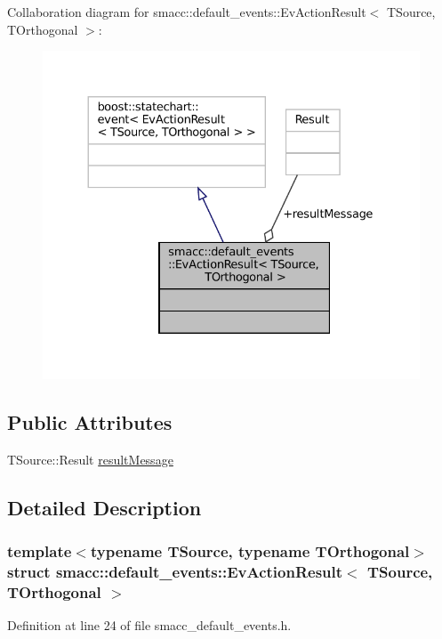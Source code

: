 Collaboration diagram for smacc\+:\+:default\+\_\+events\+:\+:Ev\+Action\+Result$<$ T\+Source, T\+Orthogonal $>$\+:
\nopagebreak
\begin{figure}[H]
\begin{center}
\leavevmode
\includegraphics[width=330pt]{structsmacc_1_1default__events_1_1EvActionResult__coll__graph}
\end{center}
\end{figure}
\subsection*{Public Attributes}
\begin{DoxyCompactItemize}
\item 
T\+Source\+::\+Result \hyperlink{structsmacc_1_1default__events_1_1EvActionResult_a2582f3c97f0061369093c47d5abe5b5a}{result\+Message}
\end{DoxyCompactItemize}


\subsection{Detailed Description}
\subsubsection*{template$<$typename T\+Source, typename T\+Orthogonal$>$\newline
struct smacc\+::default\+\_\+events\+::\+Ev\+Action\+Result$<$ T\+Source, T\+Orthogonal $>$}



Definition at line 24 of file smacc\+\_\+default\+\_\+events.\+h.



